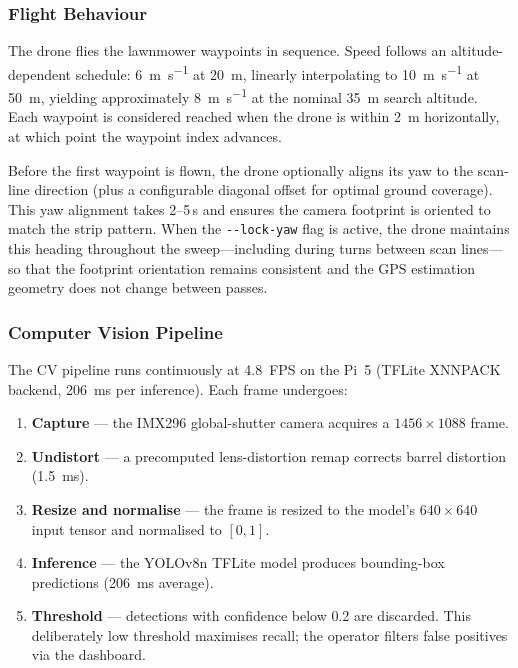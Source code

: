 \subsubsection{Flight Behaviour}

The drone flies the lawnmower waypoints in sequence.  Speed follows an altitude-dependent schedule: \SI{6}{\metre\per\second} at \SI{20}{\metre}, linearly interpolating to \SI{10}{\metre\per\second} at \SI{50}{\metre}, yielding approximately \SI{8}{\metre\per\second} at the nominal \SI{35}{\metre} search altitude.  Each waypoint is considered reached when the drone is within \SI{2}{\metre} horizontally, at which point the waypoint index advances.

Before the first waypoint is flown, the drone optionally aligns its yaw to the scan-line direction (plus a configurable diagonal offset for optimal ground coverage).  This yaw alignment takes 2--5\,s and ensures the camera footprint is oriented to match the strip pattern.  When the \texttt{-{}-lock-yaw} flag is active, the drone maintains this heading throughout the sweep---including during turns between scan lines---so that the footprint orientation remains consistent and the GPS estimation geometry does not change between passes.

\subsubsection{Computer Vision Pipeline}

The CV pipeline runs continuously at \SI{4.8}{FPS} on the Pi~5 (TFLite XNNPACK backend, \SI{206}{\milli\second} per inference).  Each frame undergoes:

\begin{enumerate}
  \item \textbf{Capture} --- the IMX296 global-shutter camera acquires a $1456\!\times\!1088$ frame.
  \item \textbf{Undistort} --- a precomputed lens-distortion remap corrects barrel distortion (\SI{1.5}{\milli\second}).
  \item \textbf{Resize and normalise} --- the frame is resized to the model's $640\!\times\!640$ input tensor and normalised to $[0, 1]$.
  \item \textbf{Inference} --- the YOLOv8n TFLite model produces bounding-box predictions (\SI{206}{\milli\second} average).
  \item \textbf{Threshold} --- detections with confidence below 0.2 are discarded.  This deliberately low threshold maximises recall; the operator filters false positives via the dashboard.
\end{enumerate}

